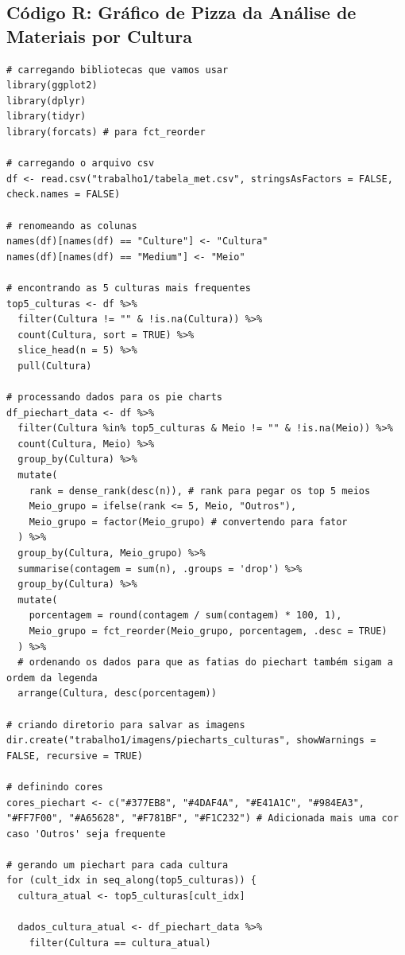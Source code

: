 \documentclass[11pt,a4paper]{article}
\begin{document}
\subsection*{Código R: Gráfico de Pizza da Análise de Materiais por Cultura}
\label{anx:codigo_piechart_cultura_material}
\begin{verbatim}
# carregando bibliotecas que vamos usar
library(ggplot2)
library(dplyr)
library(tidyr)
library(forcats) # para fct_reorder

# carregando o arquivo csv
df <- read.csv("trabalho1/tabela_met.csv", stringsAsFactors = FALSE, check.names = FALSE)

# renomeando as colunas
names(df)[names(df) == "Culture"] <- "Cultura"
names(df)[names(df) == "Medium"] <- "Meio"

# encontrando as 5 culturas mais frequentes
top5_culturas <- df %>%
  filter(Cultura != "" & !is.na(Cultura)) %>%
  count(Cultura, sort = TRUE) %>%
  slice_head(n = 5) %>%
  pull(Cultura)

# processando dados para os pie charts
df_piechart_data <- df %>%
  filter(Cultura %in% top5_culturas & Meio != "" & !is.na(Meio)) %>%
  count(Cultura, Meio) %>%
  group_by(Cultura) %>%
  mutate(
    rank = dense_rank(desc(n)), # rank para pegar os top 5 meios
    Meio_grupo = ifelse(rank <= 5, Meio, "Outros"),
    Meio_grupo = factor(Meio_grupo) # convertendo para fator
  ) %>%
  group_by(Cultura, Meio_grupo) %>%
  summarise(contagem = sum(n), .groups = 'drop') %>%
  group_by(Cultura) %>%
  mutate(
    porcentagem = round(contagem / sum(contagem) * 100, 1),
    Meio_grupo = fct_reorder(Meio_grupo, porcentagem, .desc = TRUE)
  ) %>%
  # ordenando os dados para que as fatias do piechart também sigam a ordem da legenda
  arrange(Cultura, desc(porcentagem))

# criando diretorio para salvar as imagens
dir.create("trabalho1/imagens/piecharts_culturas", showWarnings = FALSE, recursive = TRUE)

# definindo cores
cores_piechart <- c("#377EB8", "#4DAF4A", "#E41A1C", "#984EA3", "#FF7F00", "#A65628", "#F781BF", "#F1C232") # Adicionada mais uma cor caso 'Outros' seja frequente

# gerando um piechart para cada cultura
for (cult_idx in seq_along(top5_culturas)) {
  cultura_atual <- top5_culturas[cult_idx]
  
  dados_cultura_atual <- df_piechart_data %>%
    filter(Cultura == cultura_atual)
  

\end{verbatim}
\end{document}
